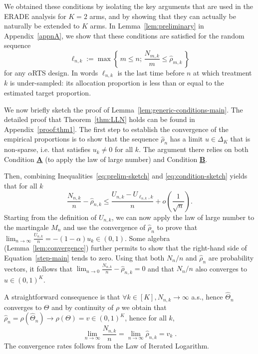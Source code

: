 We obtained these conditions by isolating the key arguments that are used in the ERADE analysis for $K=2$ arms, and by showing that they can actually be naturally be extended to $K$ arms. In Lemma~\ref{lem:preliminary} in Appendix~\ref{appnA}, we show that these conditions are satisfied for the random sequence
\[\ell_{n,k} := \max \left\{\, m \leq n ; \, \frac{N_{m,k}}{m} \leq \hat{\rho}_{m,k}  \,\right\}\]
for any $\alpha$RTS design. In words $\ell_{n,k}$ is the last time before \(n\) at which treatment \(k\) is under-sampled: its allocation proportion is less than or equal to the estimated target proportion.

\smallskip

We now briefly sketch the proof of Lemma~\ref{lem:generic-conditions-main}. The detailed proof that Theorem~\ref{thm:LLN} holds can be found in Appendix~\ref{proof:thm1}. The first step to establish the convergence of the empirical proportions is to show that the sequence $\hat{\rho}_n$ has a limit $u \in \Delta_K$ that is non-sparse, i.e. that satisfies $u_k \neq 0$ for all $k$. The argument there relies on both Condition \hyperlink{CA}{\textbf{A}} (to apply the law of large number) and Condition \hyperlink{CB}{\textbf{B}}.

Then, combining Inequalities~\eqref{eq:prelim-sketch} and \eqref{eq:condition-sketch} yields that for all $k$
\begin{equation}\label{step-main}\frac{N_{n,k}}{n} - \hat{\rho}_{n,k} \leq \frac{U_{n,k}- U_{\ell_{n,k},k}}{n} + o\left(\frac{1}{\sqrt{n}}\right).\end{equation}
Starting from the definition of $U_{n,k}$, we can now apply the law of large number to the martingale $M_n$ and use the convergence of $\hat{\rho}_{n}$ to prove that $\lim_{n\rightarrow \infty} \frac{U_{n,k}}{n} = -(1-\alpha)u_k \in (0,1)$. Some algebra (Lemma~\ref{lem:convergence}) further permits to show that the right-hand side of Equation~\eqref{step-main} tends to zero. Using that both $N_n/n$ and $\hat{\rho}_n$ are probability vectors, it follows that $\lim_{n\rightarrow 0} \frac{N_{n,k}}{n} - \hat{\rho}_{n,k} = 0$ and that ${N_{n}}/{n}$ also converges to $u \in (0,1)^K$.

A straightforward consequence is that $\forall k \in [K], N_{n,k} \to \infty$ a.s., hence $\hat{\Theta}_n$ converges to $\Theta$ and by continuity of \(\rho\) we obtain that \(\hat{\rho}_n = \rho(\hat{\Theta}_n) \to \rho(\Theta) = v \in (0,1)^K\), hence for all $k$,
	\[
	\lim_{n \to \infty} \frac{N_{n,k}}{n} = \lim_{n \to \infty} \hat{\rho}_{n,k} = v_k\;.
	\]
	The convergence rates follows from the Law of Iterated Logarithm.

